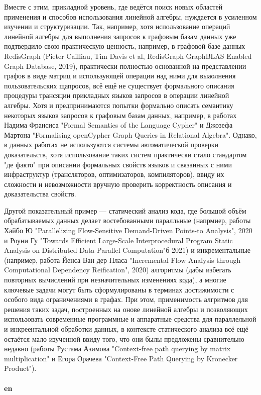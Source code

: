 \documentclass[12pt]{article}  %
\theoremstyle{remark}
\begin{document}
Вместе с этим, прикладной уровень, где ведётся поиск новых областей применения и способов использования линейной алгебры, нуждается в усиленном изучении и структуризации. Так, например, хотя использование операций линейной алгебры для выполнения запросов к графовым базам данных уже подтвердило свою практическую ценность, например, в графовой базе данных RedisGraph (Pieter Cailliau, Tim Davis et al, RedisGraph GraphBLAS Enabled Graph Database, 2019), практически полностью основанной на представлении графов в виде матриц и использующей операции над ними для выаолнения пользовательских щапросов, всё ещё не существует формального описания процедуры трансяции прикладных языков запросов в операции линейной алгебры. Хотя и предпринимаются попытки формально описать семантику некоторых языков запросов к графовым базам данных, например, в работах Надима Франсиса "Formal Semantics of the Language Cypher" и Джозефа Мартона "Formalising openCypher Graph Queries
in Relational Algebra". Однако, в данных работах не используются системы автоматической проверки доказательств, хотя использование таких систем практически стало стандартом "де факто" при описании формальных свойств языков и связанных с ними инфраструктур (трансляторов, оптимизаторов, компиляторов), ввиду их сложности и невозможности вручную проверить корректность описания и доказательства свойств. 

Другой показательный пример --- статический анализ кода, где большой объём обрабатываемых данных делает востебованными паралльные (напрмиер, работы Хайбо Ю "Parallelizing Flow-Sensitive Demand-Driven Points-to Analysis", 2020 и Роуни Гу "Towards Efficient Large-Scale Interprocedural Program Static Analysis on Distributed Data-Parallel Computation"б 2021) и инкрементальные (например, работа Йенса Ван дер Пласа "Incremental Flow Analysis through Computational Dependency Reification", 2020) алгоритмы (дабы избегать повторных вычислений при незначительных изменениях кода), а многие ключевые задачи могут быть сформулированы в терминах достижимости с особого вида ограничениями в графах. При этом, применимость алгритмов для решения таких задач, пoстроенных на онове линейной алгебры и позволяющих использовать современные программные и аппаратные средства для параллельной и инкреентальной обработки данных, в контексте статического анализа всё ещё остаётся мало изученной ввиду того, что они былы предложены сравнительно недавно (работы Рустама Азимова "Context-free path querying by matrix multiplication" и Егора Орачева "Context-Free Path Querying by Kronecker Product").
\\
\\
\textbf{en}\\
\end{document}
